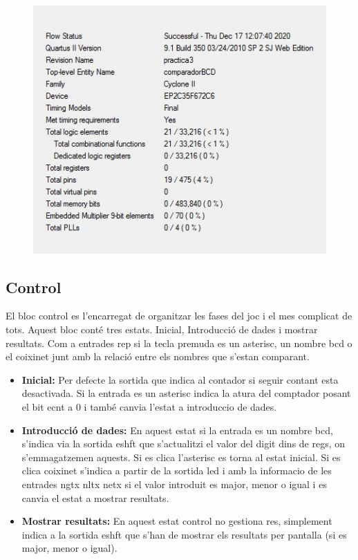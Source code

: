 \documentclass[12pt, a4papre]{article}
\begin{document}
\begin{figure}[H]
		\begin{center}
		\includegraphics[width=130mm]{informeComparador.jpeg}
		\end{center}
	\end{figure}


\subsection{Control}

	El bloc control es l'encarregat de organitzar les fases del joc i el mes complicat de tots. Aquest bloc conté tres estats. Inicial, Introducció de dades i mostrar resultats. Com a entrades rep si la tecla premuda es un asterisc, un nombre bcd o el coixinet junt amb la relació entre els nombres que s'estan comparant.
	
	\begin{itemize}
		\item \textbf{Inicial:} Per defecte la sortida que indica al contador si seguir contant esta desactivada. Si la entrada es un asterisc indica la atura del comptador posant el bit ecnt a 0 i també canvia l'estat a introduccio de dades.
		\item \textbf{Introducció de dades: }  En aquest estat si la entrada es un nombre bcd, s'indica via la sortida eshft que s'actualitzi el valor del digit dins de regs, on s'emmagatzemen aquests. Si es clica l'asterisc es torna al estat inicial. Si es clica coixinet s'indica a partir de la sortida led i amb la informacio de les entrades ngtx nltx netx si el valor introduit es major, menor o igual i es canvia el estat a mostrar resultats.
		\item \textbf{Mostrar resultats: } En aquest estat control no gestiona res, simplement indica a la sortida eshft que s'han de mostrar els resultats per pantalla (si es major, menor o igual).
	\end{itemize}
		
\end{document}
